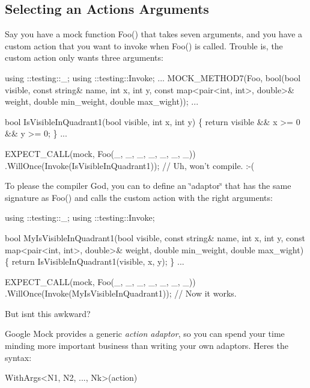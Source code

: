 \subsection*{Selecting an Action\textquotesingle{}s Arguments}

Say you have a mock function {\ttfamily Foo()} that takes seven arguments, and you have a custom action that you want to invoke when {\ttfamily Foo()} is called. Trouble is, the custom action only wants three arguments\+:


\begin{DoxyCode}
using ::testing::\_;
using ::testing::Invoke;
...
  MOCK\_METHOD7(Foo, bool(bool visible, const string& name, int x, int y,
                         const map<pair<int, int>, double>& weight,
                         double min\_weight, double max\_wight));
...

bool IsVisibleInQuadrant1(bool visible, int x, int y) \{
  return visible && x >= 0 && y >= 0;
\}
...

  EXPECT\_CALL(mock, Foo(\_, \_, \_, \_, \_, \_, \_))
      .WillOnce(Invoke(IsVisibleInQuadrant1));  // Uh, won't compile. :-(
\end{DoxyCode}


To please the compiler God, you can to define an \char`\"{}adaptor\char`\"{} that has the same signature as {\ttfamily Foo()} and calls the custom action with the right arguments\+:


\begin{DoxyCode}
using ::testing::\_;
using ::testing::Invoke;

bool MyIsVisibleInQuadrant1(bool visible, const string& name, int x, int y,
                            const map<pair<int, int>, double>& weight,
                            double min\_weight, double max\_wight) \{
  return IsVisibleInQuadrant1(visible, x, y);
\}
...

  EXPECT\_CALL(mock, Foo(\_, \_, \_, \_, \_, \_, \_))
      .WillOnce(Invoke(MyIsVisibleInQuadrant1));  // Now it works.
\end{DoxyCode}


But isn\textquotesingle{}t this awkward?

Google Mock provides a generic {\itshape action adaptor}, so you can spend your time minding more important business than writing your own adaptors. Here\textquotesingle{}s the syntax\+:


\begin{DoxyCode}
WithArgs<N1, N2, ..., Nk>(action)
\end{DoxyCode}


